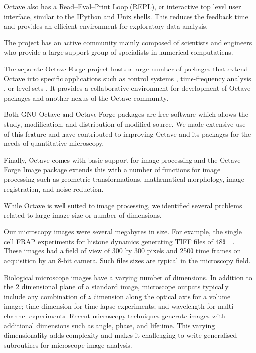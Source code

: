 Octave also has a Read--Eval--Print Loop (REPL), or interactive top
level user interface, similar to the IPython and Unix shells.  This reduces the
feedback time and provides an efficient
environment for exploratory data analysis.

The project has an active community
mainly composed of
scientists and engineers who provide a large support group of
specialists in numerical computations.

The separate Octave Forge project hosts a large number of
packages that extend Octave into specific applications such as control
systems \citep{octave-control}, time-frequency analysis
\citep{octave-ltfat}, or level sets \citep{octave-level-set}.
It provides a collaborative environment for development of Octave
packages and another nexus of the Octave community.

Both GNU Octave and Octave Forge packages are free software which allows
the study, modification, and distribution of modified source.
We made extensive
use of this feature and have contributed to improving Octave and its
packages for the needs of quantitative microscopy.

Finally, Octave comes with basic support for image processing and the
Octave Forge Image package extends this with a number of functions for
image processing such as geometric transformations, mathematical
morphology, image registration, and noise reduction.

While Octave is well suited to image
processing, we identified several problems related to
large image size or number of dimensions.

Our microscopy images
were several megabytes in size.  For example, the single cell
FRAP experiments for histone dynamics generating
TIFF files of \SI{489}{\mebi\byte}.
These images had a field of view of 300
by 300 pixels and 2500 time frames
on acquisition by an 8-bit camera.
Such files sizes are typical in the microscopy field.

Biological microscope images have a varying number of dimensions.
In addition to the 2 dimensional plane of a standard image, microscope
outputs typically include any combination of $z$ dimension along
the optical axis for a volume image; time dimension for time-lapse
experiments; and wavelength for multi-channel experiments.  Recent microscopy
techniques generate images with additional dimensions
such as angle, phase, and lifetime.  This varying dimensionality adds
complexity and makes it challenging to write generalised subroutines for
microscope image analysis.

